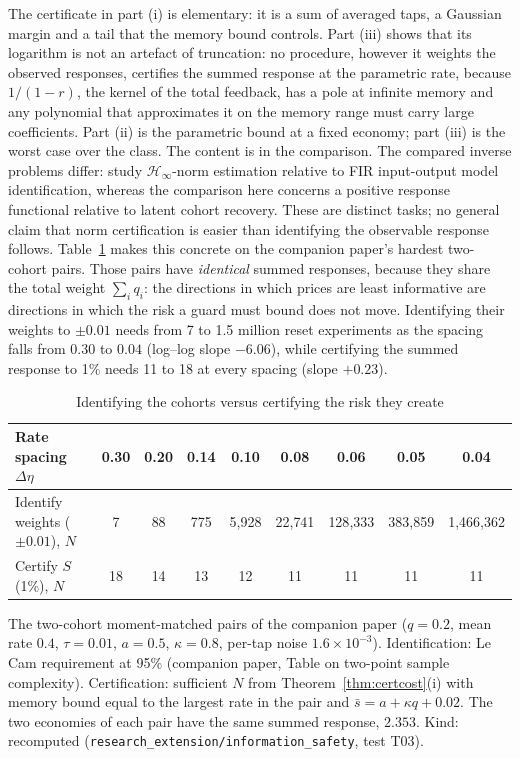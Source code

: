 \documentclass[12pt]{article}
\theoremstyle{definition}
\theoremstyle{remark}
\begin{document}
The certificate in part (i) is elementary: it is a sum of averaged taps, a Gaussian margin and a tail that the memory bound controls. Part (iii) shows that its logarithm is not an artefact of truncation: no procedure, however it weights the observed responses, certifies the summed response at the parametric rate, because $1/(1-r)$, the kernel of the total feedback, has a pole at infinite memory and any polynomial that approximates it on the memory range must carry large coefficients. Part (ii) is the parametric bound at a fixed economy; part (iii) is the worst case over the class. The content is in the comparison. The compared inverse problems differ: \citet{tu2018} study $\mathcal H_\infty$-norm estimation relative to FIR input-output model identification, whereas the comparison here concerns a positive response functional relative to latent cohort recovery. These are distinct tasks; no general claim that norm certification is easier than identifying the observable response follows. Table~\ref{tab:certvsid} makes this concrete on the companion paper's hardest two-cohort pairs. Those pairs have \emph{identical} summed responses, because they share the total weight $\sum_iq_i$: the directions in which prices are least informative are directions in which the risk a guard must bound does not move. Identifying their weights to $\pm0.01$ needs from 7 to 1.5 million reset experiments as the spacing falls from $0.30$ to $0.04$ (log--log slope $-6.06$), while certifying the summed response to 1\% needs 11 to 18 at every spacing (slope $+0.23$).

\begin{table}[t]\centering\small
\begin{threeparttable}
\caption{Identifying the cohorts versus certifying the risk they create}\label{tab:certvsid}
\begin{tabular}{lcccccccc}
\toprule
Rate spacing $\Delta\eta$ & 0.30 & 0.20 & 0.14 & 0.10 & 0.08 & 0.06 & 0.05 & 0.04\\
\midrule
Identify weights ($\pm0.01$), $N$ & 7 & 88 & 775 & 5{,}928 & 22{,}741 & 128{,}333 & 383{,}859 & 1{,}466{,}362\\
Certify $S$ (1\%), $N$ & 18 & 14 & 13 & 12 & 11 & 11 & 11 & 11\\
\bottomrule
\end{tabular}
\begin{tablenotes}\footnotesize\item The two-cohort moment-matched pairs of the companion paper ($q=0.2$, mean rate $0.4$, $\tau=0.01$, $a=0.5$, $\kappa=0.8$, per-tap noise $1.6\times10^{-3}$). Identification: Le Cam requirement at 95\% (companion paper, Table on two-point sample complexity). Certification: sufficient $N$ from Theorem~\ref{thm:certcost}(i) with memory bound equal to the largest rate in the pair and $\bar s=a+\kappa q+0.02$. The two economies of each pair have the same summed response, $2.353$. Kind: recomputed (\texttt{research\_extension/information\_safety}, test T03).\end{tablenotes}
\end{threeparttable}
\end{table}
\end{document}
